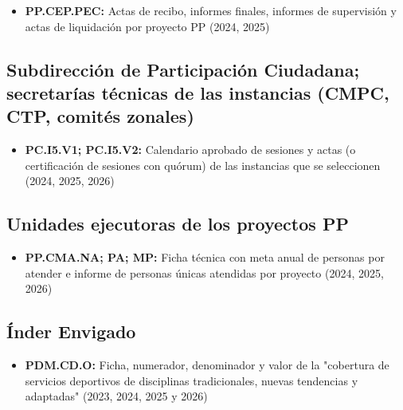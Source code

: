 \documentclass[11pt,letterpaper]{article}
\begin{document}
\begin{itemize}

\item \textbf{PP.CEP.PEC:} Actas de recibo, informes finales, informes de supervisión y actas de liquidación por proyecto PP (2024, 2025)

\end{itemize}

\subsection*{Subdirección de Participación Ciudadana; secretarías técnicas de las instancias (CMPC, CTP, comités zonales)}

\begin{itemize}

\item \textbf{PC.I5.V1; PC.I5.V2:} Calendario aprobado de sesiones y actas (o certificación de sesiones con quórum) de las instancias que se seleccionen (2024, 2025, 2026)

\end{itemize}

\subsection*{Unidades ejecutoras de los proyectos PP}

\begin{itemize}

\item \textbf{PP.CMA.NA; PA; MP:} Ficha técnica con meta anual de personas por atender e informe de personas únicas atendidas por proyecto (2024, 2025, 2026)

\end{itemize}

\subsection*{Índer Envigado}

\begin{itemize}

\item \textbf{PDM.CD.O:} Ficha, numerador, denominador y valor de la "cobertura de servicios deportivos de disciplinas tradicionales, nuevas tendencias y adaptadas" (2023, 2024, 2025 y 2026)

\end{itemize}

\endgroup
\end{document}
